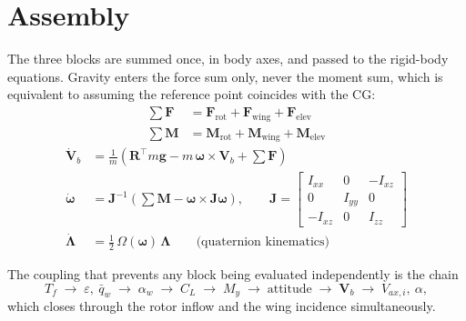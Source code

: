 \documentclass[11pt,a4paper]{article}
\newcommand{\vect}[1]{\bm{#1}}
\begin{document}
\section{Assembly}
The three blocks are summed once, in body axes, and passed to the rigid-body
equations. Gravity enters the force sum only, never the moment sum, which is
equivalent to assuming the reference point coincides with the CG:
\begin{align}
\sum\vect F&=\vect F_{\mathrm{rot}}+\vect F_{\mathrm{wing}}+\vect F_{\mathrm{elev}}\\
\sum\vect M&=\vect M_{\mathrm{rot}}+\vect M_{\mathrm{wing}}+\vect M_{\mathrm{elev}}
\end{align}
\begin{align}
\dot{\vect V}_b&=\frac{1}{m}\left(\mathbf{R}^{\!\top}m\vect g
-m\,\vect\omega\times\vect V_b+\sum\vect F\right)\\
\dot{\vect\omega}&=\mathbf{J}^{-1}\left(\sum\vect M-\vect\omega\times\mathbf{J}\vect\omega\right),
\qquad
\mathbf{J}=\begin{bmatrix}
I_{xx}&0&-I_{xz}\\ 0&I_{yy}&0\\ -I_{xz}&0&I_{zz}
\end{bmatrix}\\
\dot{\vect\Lambda}&=\tfrac12\,\Omega(\vect\omega)\,\vect\Lambda
\qquad\text{(quaternion kinematics)}
\end{align}

\noindent
The coupling that prevents any block being evaluated independently is the chain
\begin{equation*}
T_f \;\longrightarrow\; \varepsilon,\ \bar q_w
\;\longrightarrow\; \alpha_w \;\longrightarrow\; C_L
\;\longrightarrow\; M_y \;\longrightarrow\; \text{attitude}
\;\longrightarrow\; \vect V_b \;\longrightarrow\; V_{ax,i},\ \alpha,
\end{equation*}
which closes through the rotor inflow and the wing incidence simultaneously.
\end{document}
